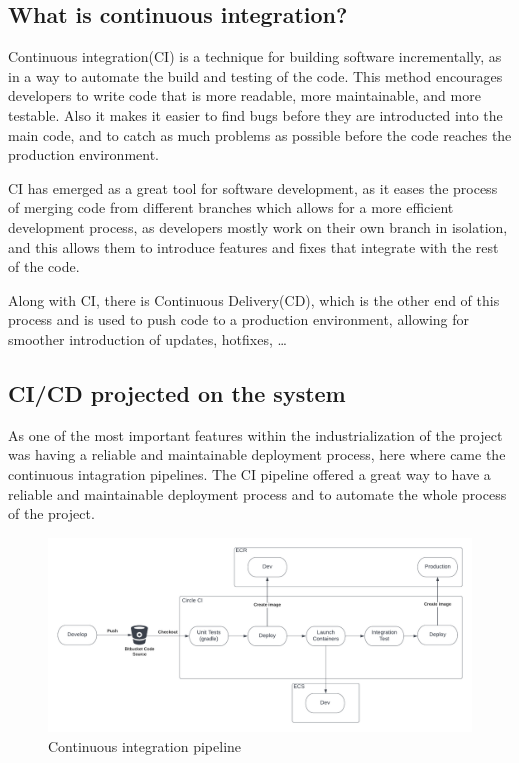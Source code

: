 \subsection{What is continuous integration?}

Continuous integration(CI) is a technique for building software incrementally, as in a way
to automate the build and testing of the code. This method encourages developers to 
write code that is more readable, more maintainable, and more testable. Also it makes
it easier to find bugs before they are introducted into the main code, and to
catch as much problems as possible before the code reaches the production environment.

CI has emerged as a great tool for software development, as it eases the process of
merging code from different branches which allows for a more efficient development process,
as developers mostly work on their own branch in isolation, and this allows them to 
introduce features and fixes that integrate with the rest of the code. \cite{ci_msft}

Along with CI, there is Continuous Delivery(CD), which is the other end of this process
and is used to push code to a production environment, allowing for smoother introduction
of updates, hotfixes, \dots

\subsection{CI/CD projected on the system}

As one of the most important features within the industrialization of the project
was having a reliable and maintainable deployment process, here where came the 
continuous intagration pipelines. The CI pipeline offered a great way to have
a reliable and maintainable deployment process and to automate the whole process
of the project.

\begin{figure}[!htpb]
    \centering
    \includegraphics[width=\textwidth]{images/ci-cd-pipeline.png}
    \caption{Continuous integration pipeline}
    \label{fig:ci-cd-pipeline}
\end{figure}

